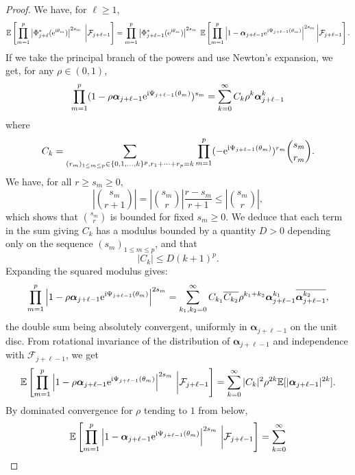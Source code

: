 \documentclass[]{article}
\begin{document}
\begin{proof}
We have, for 
$\ell \geq 1$, 
$$\mathbb{E} \left[ \prod_{m=1}^p \left|\Phi^*_{j+\ell} (\mathrm{e}^{\textnormal{i} \theta_m})
\right|^{2s_m} \;  \bigg| \mathcal{F}_{j+ \ell - 1} \right]
= \prod_{m=1}^p \left|\Phi^*_{j+\ell-1} (\mathrm{e}^{\textnormal{i} \theta_m})
\right|^{2s_m} \; 
\mathbb{E} \left[ \prod_{m=1}^p \left| 1 - \boldsymbol{\alpha}_{j+\ell-1} \mathrm{e}^{\textnormal{i} \Psi_{j+ \ell - 1} (\theta_m) }\right|^{2s_m} \bigg| \mathcal{F}_{j+ \ell-1} \right].
$$
If we take the principal branch of the powers
and use Newton's expansion, we get, for any $\rho \in (0,1)$,  
$$
\prod_{m=1}^p ( 1 - \rho \boldsymbol{\alpha}_{j+\ell-1} \mathrm{e}^{\textnormal{i} \Psi_{j+ \ell - 1} (\theta_m) })^{s_m} 
= \sum_{k=0}^{\infty} C_k \rho^k \boldsymbol{\alpha}^k_{j+\ell-1}
$$
where 
$$C_k = \sum_{(r_m)_{1 \leq m \leq p} \in
\{0,1,\dots, k\}^p, r_1 + \dots + r_p = k}
\prod_{m=1}^{p} (-\mathrm{e}^{\textnormal{i} \Psi_{j+ \ell - 1} (\theta_m) })^{r_m}
{s_m \choose r_m}.
$$
We have, for all $r \geq s_m \geq 0$, 
$$ \left|{s_m \choose {r+1}} \right|
=\left| {s_m \choose r} \right|\frac{r - s_m}{r+1} \leq \left| {s_m \choose r} \right|,$$
which shows that ${s_m \choose r} $ is bounded 
for fixed $s_m \geq 0$. 
We deduce that each term in the sum giving $C_k$ has a modulus bounded by a quantity $D > 0$ depending only on the sequence $(s_m)_{1 \leq m \leq p}$, and that 
$$|C_k| \leq D (k+1)^p. $$
Expanding the squared modulus gives: 
$$\prod_{m=1}^p \left| 1 - \rho \boldsymbol{\alpha}_{j+\ell-1} \mathrm{e}^{\textnormal{i} \Psi_{j+ \ell - 1} (\theta_m) }\right|^{2s_m} = 
\sum_{k_1, k_2 = 0}^{\infty}
C_{k_1} \overline{C_{k_2}} \rho^{k_1 + k_2}
\boldsymbol{\alpha}^{k_1}_{j+\ell-1} \overline{\boldsymbol{\alpha}_{j+\ell-1}^{k_2}},
$$
the double sum being absolutely convergent, uniformly in $\boldsymbol{\alpha}_{j+\ell-1}$ on the unit disc.  
From rotational invariance of the distribution of  $\boldsymbol{\alpha}_{j+\ell-1}$ and independence 
with $\mathcal{F}_{j+\ell-1}$, we get 
$$\mathbb{E} \left[ \prod_{m=1}^p \left| 1 - \rho \boldsymbol{\alpha}_{j+\ell-1} \mathrm{e}^{\textnormal{i} \Psi_{j+ \ell - 1} (\theta_m) }\right|^{2s_m} \, \bigg| \mathcal{F}_{j+ \ell-1} \right] 
= \sum_{k=0}^{\infty} 
|C_k|^2 \rho^{2k} \mathbb{E}[ |\boldsymbol{\alpha}_{j+\ell-1} |^{2k} ].$$
By dominated convergence for $\rho$ tending to $1$ from below, 
$$\mathbb{E} \left[ \prod_{m=1}^p \left| 1 -  \boldsymbol{\alpha}_{j+\ell-1} \mathrm{e}^{\textnormal{i} \Psi_{j+ \ell - 1} (\theta_m) }\right|^{2s_m} \, \bigg| \mathcal{F}_{j+ \ell-1} \right] 
= \sum_{k=0}^{\infty} 
$$
\end{proof}
\end{document}
